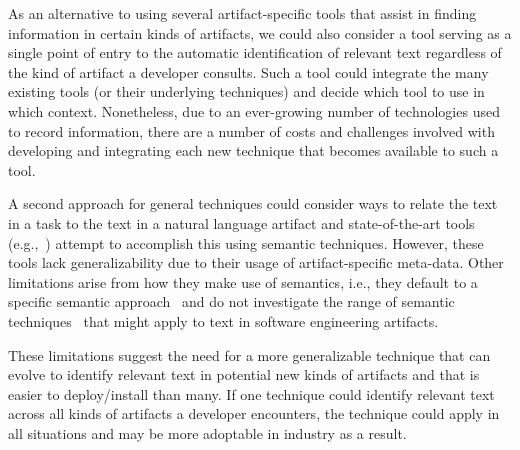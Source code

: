 As an alternative to using several artifact-specific tools that assist in finding information in certain kinds of artifacts, we could also consider 
a tool serving as a single point of entry to the automatic identification of relevant text regardless of the kind of artifact a developer consults.
Such a tool could integrate the many existing tools (or their underlying techniques) and decide which tool 
to use in which context. Nonetheless, 
due to an ever-growing number of technologies used to record information,
there are a number of costs and challenges involved with 
developing and integrating each new technique that  
becomes available to such a tool. 


A second approach for general techniques could consider ways to relate the text in a task 
to the text in a natural language artifact and  
state-of-the-art tools (e.g.,~\cite{Xu2017, silva2019}) attempt to accomplish this using semantic techniques.
However, these tools lack generalizability 
due to their usage of artifact-specific meta-data. Other limitations arise from how they make use of semantics,
i.e., they default to a specific semantic approach~\cite{Ye2016} and do not investigate the range of semantic techniques~\cite{Mikolov2013, Devlin2018Bert, fillmore1976frame} 
that might apply to text in software engineering artifacts.






These limitations suggest the need for a more generalizable technique
that can evolve to 
identify relevant text in potential new kinds of artifacts 
and that is easier to deploy/install than many.
If one technique could identify relevant text across all kinds
of artifacts a developer encounters, the technique
could apply in all situations and may be more adoptable in industry
as a result. 










